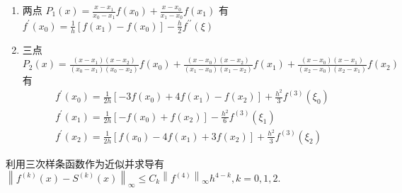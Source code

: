 \documentclass[10pt]{yerbaformat}
\begin{document}
\begin{enumerate}
    \item 两点 $P_{1}(x)=\frac{x-x_{1}}{x_{0}-x_{1}} f\left(x_{0}\right)+\frac{x-x_{0}}{x_{1}-x_{0}} f\left(x_{1}\right)$ 有 $f^{\prime}\left(x_{0}\right)=\frac{1}{h}\left[f\left(x_{1}\right)-f\left(x_{0}\right)\right]-\frac{h}{2} f^{\prime \prime}(\xi)$
    \item 三点 $P_{2}(x)=\frac{\left(x-x_{1}\right)\left(x-x_{2}\right)}{\left(x_{0}-x_{1}\right)\left(x_{0}-x_{2}\right)} f\left(x_{0}\right)+\frac{\left(x-x_{0}\right)\left(x-x_{2}\right)}{\left(x_{1}-x_{0}\right)\left(x_{1}-x_{2}\right)} f\left(x_{1}\right)+\frac{\left(x-x_{0}\right)\left(x-x_{1}\right)}{\left(x_{2}-x_{0}\right)\left(x_{2}-x_{1}\right)} f\left(x_{2}\right)$ 有
          $$
              \begin{array}{l}
                  f^{\prime}\left(x_{0}\right)=\frac{1}{2 h}\left[-3 f\left(x_{0}\right)+4 f\left(x_{1}\right)-f\left(x_{2}\right)\right]+\frac{h^{2}}{3} f^{(3)}\left(\xi_{0}\right) \\
                  f^{\prime}\left(x_{1}\right)=\frac{1}{2 h}\left[-f\left(x_{0}\right)+f\left(x_{2}\right)\right]-\frac{h^{2}}{6} f^{(3)}\left(\xi_{1}\right)                         \\
                  f^{\prime}\left(x_{2}\right)=\frac{1}{2 h}\left[f\left(x_{0}\right)-4 f\left(x_{1}\right)+3 f\left(x_{2}\right)\right]+\frac{h^{2}}{3} f^{(3)}\left(\xi_{2}\right)
              \end{array}
          $$
\end{enumerate}

\par 利用三次样条函数作为近似并求导有 $\left\|f^{(k)}(x)-S^{(k)}(x)\right\|_{\infty} \leq C_{k}\left\|f^{(4)}\right\|_{\infty} h^{4-k}, k=0,1,2$.
\end{document}
